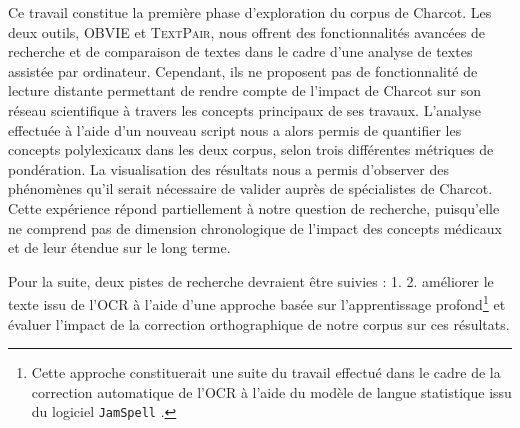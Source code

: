 



Ce travail constitue la première phase d'exploration du corpus de Charcot. Les deux outils, \textsc{OBVIE} et \textsc{TextPair}, nous offrent des fonctionnalités avancées de recherche et de comparaison de textes dans le cadre d'une analyse de textes assistée par ordinateur. Cependant, ils ne proposent pas de fonctionnalité de lecture distante permettant de rendre compte de l'impact de Charcot sur son réseau scientifique à travers les concepts principaux de ses travaux. L'analyse effectuée à l'aide d'un nouveau script nous a alors permis de quantifier les concepts polylexicaux dans les deux corpus, selon trois différentes métriques de pondération. La visualisation des résultats nous a permis d'observer des phénomènes qu'il serait nécessaire de valider auprès de spécialistes de Charcot. Cette expérience répond partiellement à notre question de recherche, puisqu'elle ne comprend pas de dimension chronologique de l'impact des concepts médicaux et de leur étendue sur le long terme.

Pour la suite, deux pistes de recherche devraient être suivies : 1. 2. améliorer le texte issu de l'\textsc{OCR} à l'aide d'une approche basée sur l'apprentissage profond\footnote{Cette approche constituerait une suite du travail effectué dans le cadre de la correction automatique de l'\textsc{OCR} à l'aide du modèle de langue statistique issu du logiciel \texttt{JamSpell} \citep{petkovic2022impact}.} et évaluer l'impact de la correction orthographique de notre corpus sur ces résultats.



